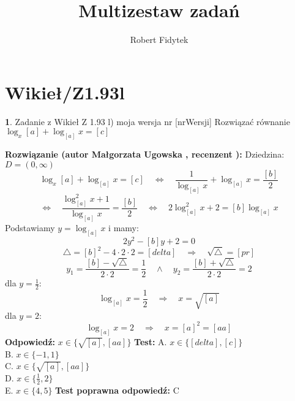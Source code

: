 \documentclass[12pt, a4paper]{article}
\title{Multizestaw zadań}
\author{Robert Fidytek}
\date{}
\theoremstyle{definition} %
\newtheorem{zad}{}
\newcommand{\kategoria}[1]{\section{#1}} %
\newcommand{\zadStart}[1]{\begin{zad}#1\newline} %
\newcommand{\zadStop}{\end{zad}}   %
\newcommand{\rozwStart}[2]{\noindent \textbf{Rozwiązanie (autor #1 , recenzent #2): }\newline} %
\newcommand{\rozwStop}{\newline}                                            %
\newcommand{\odpStart}{\noindent \textbf{Odpowiedź:}\newline}    %
\newcommand{\odpStop}{\newline}                                             %
\newcommand{\testStart}{\noindent \textbf{Test:}\newline} %
\newcommand{\testStop}{\newline} %
\newcommand{\kluczStart}{\noindent \textbf{Test poprawna odpowiedź:}\newline} %
\newcommand{\kluczStop}{\newline} %
\begin{document}
\maketitle


\kategoria{Wikieł/Z1.93l}
\zadStart{Zadanie z Wikieł Z 1.93 l) moja wersja nr [nrWersji]}
Rozwiązać równanie $\log_{x}{[a]} + \log_{[a]}{x} = [c]$
\zadStop
\rozwStart{Małgorzata Ugowska}{}
Dziedzina: $D = (0, \infty)$
$$\log_{x}{[a]} + \log_{[a]}{x} = [c] \quad \Longleftrightarrow \quad \frac{1}{\log_{[a]}{x}} + \log_{[a]}{x} = \frac{[b]}{2} $$
$$\Longleftrightarrow \quad \frac{\log^2_{[a]}{x}+1}{\log_{[a]}{x}} = \frac{[b]}{2} \quad \Longleftrightarrow \quad 2\log^2_{[a]}{x}+2 = [b] \log_{[a]}{x} $$
Podstawiamy $y=\log_{[a]}{x}$ i mamy:
$$2y^2 -[b]y+2=0$$
$$ \bigtriangleup = [b]^2 - 4 \cdot 2 \cdot 2 = [delta] \quad  \Longrightarrow \quad \sqrt{\bigtriangleup} = [pr]$$
$$y_1=\frac{[b]-\sqrt{\bigtriangleup}}{2\cdot 2} = \frac{1}{2} \quad \land \quad y_2=\frac{[b]+\sqrt{\bigtriangleup}}{2\cdot 2} = 2$$
dla $y=\frac{1}{2}$:
$$\log_{[a]}{x} = \frac{1}{2} \quad  \Longrightarrow \quad x = \sqrt{[a]}$$
dla $y=2$:
$$\log_{[a]}{x} = 2 \quad  \Longrightarrow \quad x = [a]^2 = [aa]$$
\rozwStop
\odpStart
$x \in \{\sqrt{[a]},[aa]\}$
\odpStop
\testStart
A. $x \in \{[delta], [c]\}$\\
B. $x \in \{-1, 1\}$\\
C. $x \in \{\sqrt{[a]}, [aa]\}$\\
D. $x \in \{\frac{1}{2}, 2\}$\\
E. $x \in \{4, 5\}$
\testStop
\kluczStart
C
\kluczStop
\end{document}
